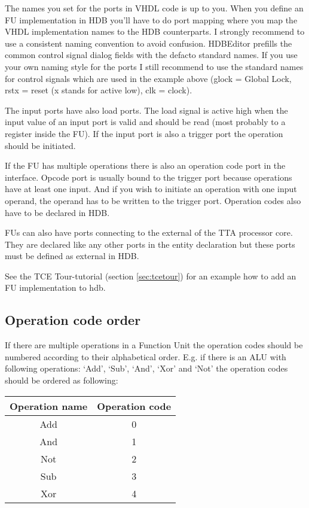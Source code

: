\documentclass[twoside]{tceusermanual}
\begin{document}
The names you set for the ports in VHDL code is up to you. When you define
an FU implementation in HDB you'll have to do port mapping where you map the
VHDL implementation names to the HDB counterparts. I strongly recommend to
use a consistent naming convention to avoid confusion. HDBEditor prefills 
the common control signal dialog fields with the defacto standard
names. If you use your own naming style for the ports I still recommend to
use the standard names for control signals which are used in the example
above (glock = Global Lock, rstx = reset (x stands for active low), clk =
clock).

The input ports have also load ports. The load signal is active high when the
input value of an input port is valid and should be read (most probably to a
register inside the FU). If the input port is also a trigger port the
operation should be initiated.

If the FU has multiple operations there is also an operation code port in the
interface. Opcode port is usually bound to the trigger port because operations
have at least one input. And if you wish to initiate an operation with one
input operand, the operand has to be written to the trigger port. Operation
codes also have to be declared in HDB.

FUs can also have ports connecting to the external of the TTA processor
core. They are declared like any other ports in the entity declaration but
these ports must be defined as external in HDB.

See the TCE Tour-tutorial (section \ref{sec:tcetour}) for an example how to
add an FU implementation to hdb.

\subsection{Operation code order}
\label{sec:opcodeorder}
If there are multiple operations in a Function Unit the operation codes
should be numbered according to their alphabetical order. E.g. if there is
an ALU with following operations: `Add', `Sub', `And', `Xor' and `Not' the
operation codes should be ordered as following:

\begin{tabular}{|c|c|}
 \hline
 Operation name & Operation code \\ \hline
 Add & 0 \\ \hline
 And & 1 \\ \hline
 Not & 2 \\ \hline
 Sub & 3 \\ \hline
 Xor & 4 \\ \hline
\end{tabular}
\end{document}
